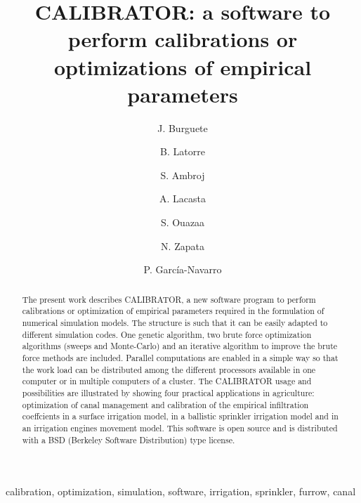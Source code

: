 \documentclass[review,authoryear]{elsarticle}
\begin{document}
\title{CALIBRATOR: a software to perform calibrations or optimizations of
empirical parameters}

\author[eead,bifi]{J. Burguete}

\author[eead]{B. Latorre}

\author[kit]{S. Ambroj}

\author[unizar]{A. Lacasta}

\author[eead]{S. Ouazaa}

\author[eead]{N. Zapata}

\author[unizar]{P. García-Navarro}


\address[eead]{Soil and Water, EEAD / CSIC.
P.O. Box 13034, 50080~Zaragoza, Spain.}
\address[bifi]{BIFI: Instituto de Biocomputación y Física de Sistemas Complejos,
Universidad de Zaragoza.
Mariano Esquillor, Edificio I+D, 50009~Zaragoza, Spain.}
\address[kit]{Steinbuch Centre for Computing (SCC),
Karlsruhe Institute of Technology (KIT).
KIT-Campus Nord, Hermann von Helmholtzplatz 1, 76344 Eggenstein - Leopoldshafen,
Germany.}
\address[unizar]{Fluid Mechanics, LIFTEC, CSIC-Universidad de Zaragoza.
María de Luna 3, 50018~Zaragoza, Spain.}

\begin{keyword}
calibration, optimization, simulation, software, irrigation, sprinkler, furrow,
canal
\end{keyword}

\begin{abstract}
The present work describes CALIBRATOR, a new software program to perform
calibrations or optimization of empirical parameters required in the formulation
of numerical simulation models. The structure is such that it can be easily
adapted to different simulation codes.
One genetic algorithm, two brute force optimization algorithms (sweeps and
Monte-Carlo) and an iterative algorithm to improve the brute force methods are
included.
Parallel computations are enabled in a simple way so that the work load can be
distributed among the different processors available in one computer or in
multiple computers of a cluster.
The CALIBRATOR usage and possibilities are illustrated by showing four practical
applications in agriculture: optimization of canal management and calibration of
the empirical infiltration coeffcients in a surface irrigation model, in a
ballistic sprinkler irrigation model and in an irrigation engines movement
model.
This software is open source and is distributed with a BSD (Berkeley Software
Distribution) type license.
\end{abstract}
\end{document}
